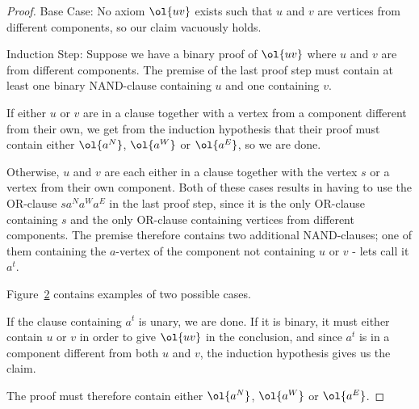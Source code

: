 \begin{proof}
  Base Case:
  No axiom $\ol{uv}$ exists such that $u$ and $v$ are vertices from different components, so our claim vacuously holds.

  Induction Step:
  Suppose we have a binary proof of $\ol{uv}$ where $u$ and $v$ are from different components.
  The premise of the last proof step must contain at least one binary NAND-clause containing $u$ and one containing $v$.\par
  \begin{figure}[!h]
    \centering
    \begin{prooftree*}
      \Hypo{\dots}
    \end{prooftree*}
    \caption{}
    \label{fig:proof_scheme_uv}
  \end{figure}
  If either $u$ or $v$ are in a clause together with a vertex from a component different from their own, we get from the induction hypothesis that their proof must contain either $\ol{a^N}$, $\ol{a^W}$ or $\ol{a^E}$, so we are done.

  Otherwise, $u$ and $v$ are each either in a clause together with the vertex $s$ or a vertex from their own component.
  Both of these cases results in having to use the OR-clause $sa^Na^Wa^E$ in the last proof step, since it is the only OR-clause containing $s$ and the only OR-clause containing vertices from different components.
  The premise therefore contains two additional NAND-clauses; one of them containing the $a$-vertex of the component not containing $u$ or $v$ - lets call it $a^t$.

  Figure~\ref{fig:proof_example_uv} contains examples of two possible cases.\par
  \begin{figure}[!h]
    \centering
    \begin{prooftree}
    \end{prooftree}
    \hspace{5mm}
    \begin{prooftree}
    \end{prooftree}
    \caption{}
    \label{fig:proof_example_uv}
  \end{figure}
  If the clause containing $a^t$ is unary, we are done.
  If it is binary, it must either contain $u$ or $v$ in order to give $\ol{uv}$ in the conclusion, and since $a^t$ is in a component different from both $u$ and $v$, the induction hypothesis gives us the claim.

  The proof must therefore contain either $\ol{a^N}$, $\ol{a^W}$ or $\ol{a^E}$.
\end{proof}
